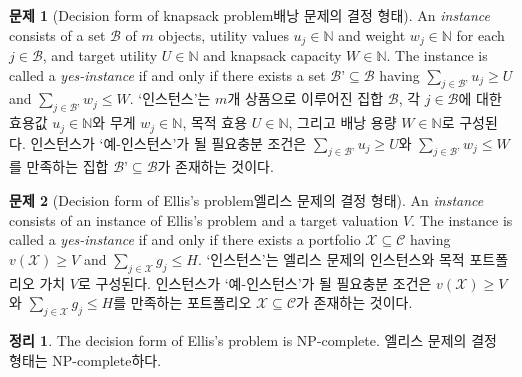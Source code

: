 \documentclass[11pt]{article} %
\newtheorem{theorem}{Theorem}
\theoremstyle{definition}
\newtheorem{problem}{Problem}
\newtheorem{theorem}{정리}
\theoremstyle{definition}
\newtheorem{problem}{문제}
\begin{document}
\begin{problem}[\ifen Decision form of knapsack problem\else 배낭 문제의 결정 형태\fi]
\ifen 
An \emph{instance} consists of a set $\mathcal{B}$ of $m$ objects, utility values $u_j \in \mathbb{N}$ and weight $w_j \in \mathbb{N}$ for each $j \in \mathcal{B}$, and target utility $U\in \mathbb{N}$ and knapsack capacity $W\in \mathbb{N}$. The instance is called a \emph{yes-instance} if and only if there exists a set $\mathcal{B’} \subseteq \mathcal{B}$ having $\sum_{j \in \mathcal{B’}} u_j \geq U$ and  $\sum_{j \in \mathcal{B’}} w_j \leq W$.
\else
`인스턴스'는 $m$개 상품으로 이루어진 집합 $\mathcal{B}$, 각 $j \in \mathcal{B}$에 대한 효용값 $u_j \in \mathbb{N}$와 무게 $w_j \in \mathbb{N}$, 목적 효용 $U\in \mathbb{N}$, 그리고 배낭 용량 $W\in \mathbb{N}$로 구성된다. 인스턴스가 `예-인스턴스'가 될 필요충분 조건은 $\sum_{j \in \mathcal{B’}} u_j \geq U$와  $\sum_{j \in \mathcal{B’}} w_j \leq W$를 만족하는 집합 $\mathcal{B’} \subseteq \mathcal{B}$가 존재하는 것이다.
\fi
\end{problem}

\begin{problem}[\ifen Decision form of Ellis's problem\else 엘리스 문제의 결정 형태\fi] \label{ellisdecisionform}
\ifen
An \emph{instance} consists of an instance of Ellis’s problem and a target valuation $V$. The instance is called a \emph{yes-instance} if and only if there exists a portfolio $\mathcal{X} \subseteq \mathcal{C}$ having $v(\mathcal{X}) \geq V$ and  $\sum_{j \in \mathcal{X}} g_j \leq H$.
\else
`인스턴스'는 엘리스 문제의 인스턴스와 목적 포트폴리오 가치 $V$로 구성된다. 인스턴스가 `예-인스턴스'가 될 필요충분 조건은 $v(\mathcal{X}) \geq V$와 $\sum_{j \in \mathcal{X}} g_j \leq H$를 만족하는 포트폴리오 $\mathcal{X} \subseteq \mathcal{C}$가 존재하는 것이다.
\fi
\end{problem}

\begin{theorem}
\ifen
The decision form of Ellis’s problem is NP-complete.
\else
엘리스 문제의 결정 형태는 NP-complete하다.
\fi
\end{theorem}
\end{document}
